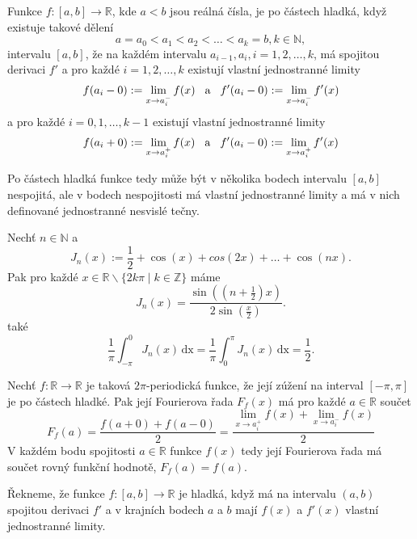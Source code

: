 \documentclass[../main.tex]{subfiles}
\begin{document}
\begin{definition}
    Funkce $f: [a,b] \to \mathbb{R}$, kde $a<b$ jsou reálná čísla, je po částech hladká, když
    existuje takové dělení
    \[ a = a_0 < a_1 < a_2 < \dots < a_k = b, k \in \mathbb{N}, \]
    intervalu $[a,b]$, že na každém intervalu $a_{i-1}, a_i, i = 1,2,\dots,k$, má
    spojitou derivaci $f'$ a pro každé $i=1,2,\dots,k$ existují vlastní jednostranné limity
    \[ f(a_i - 0) := \lim_{x\to a_i^-}f(x) \hspace{3mm} \text{a} \hspace{3mm} f'(a_i - 0) := \lim_{x\to a_i^-}f'(x) \]
    a pro každé $i=0,1,\dots,k-1$ existují vlastní jednostranné limity
    \[ f(a_i + 0) := \lim_{x\to a_i^+}f(x) \hspace{3mm} \text{a} \hspace{3mm} f'(a_i - 0) := \lim_{x\to a_i^+}f'(x) \]
\end{definition}

\noindent
Po částech hladká funkce tedy může být v několika bodech intervalu $[a,b]$ nespojitá,
ale v bodech nespojitosti má vlastní jednostranné limity a má v nich definované jednostranné nesvislé tečny.

\begin{lemma}
    Nechť $n \in \mathbb{N}$ a
    \[ J_n(x) := \frac{1}{2} + \cos(x) + cos(2x) + \dots + \cos(nx). \]
    Pak pro každé $x \in \mathbb{R} \backslash \{ 2k\pi \mid k \in \mathbb{Z} \}$
    máme \[ J_n(x) = \frac{\sin\left(\left(n + \frac{1}{2}\right)x\right)}{2\sin\left(\frac{x}{2}\right)}. \]
    také
    \[ \frac{1}{\pi}\int_{-\pi}^{0} J_n(x)\,\text{dx} = \frac{1}{\pi}\int_{0}^{\pi} J_n(x)\,\text{dx} = \frac{1}{2}. \] 
\end{lemma}

\begin{theorem}[Dirichletova]
    Nechť $f:\mathbb{R}\to\mathbb{R}$ je taková $2\pi$-periodická funkce, že její zúžení na interval $[-\pi,\pi]$
    je po částech hladké. Pak její Fourierova řada $F_f(x)$ má pro každé $a\in\mathbb{R}$ součet
    \[ F_f(a) = \frac{f(a+0) + f(a-0)}{2} = \frac{\lim_{x\to a_i^+}f(x) + \lim_{x\to a_i^-}f(x)}{2} \]
    V každém bodu spojitosti $a\in\mathbb{R}$ funkce $f(x)$ tedy její Fourierova řada má součet rovný
    funkční hodnotě, $F_f(a) = f(a)$.
\end{theorem}

\begin{definition}
    Řekneme, že funkce $f:[a,b]\to \mathbb{R}$ je hladká, když má na intervalu $(a,b)$ spojitou derivaci $f'$ a v krajních
    bodech $a$ a $b$ mají $f(x)$ a $f'(x)$ vlastní jednostranné limity.
\end{definition}
\end{document}
